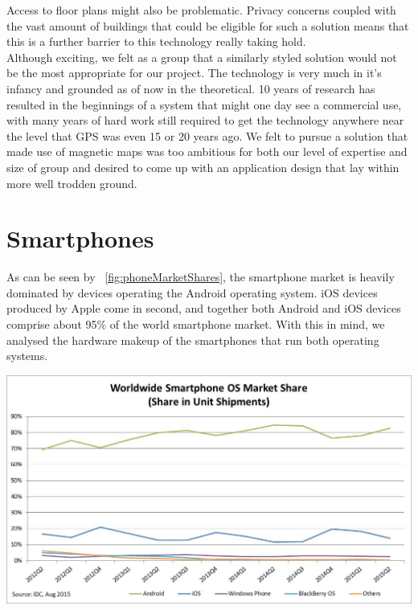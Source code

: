 \documentclass[main.tex]{subfiles}
\begin{document}
 Access to floor plans might also be problematic. Privacy concerns coupled with the vast amount of buildings that could be eligible for such a solution means that this is a further barrier to this technology really taking hold.\\
 
Although exciting, we felt as a group that a similarly styled solution would not be the most appropriate for our project. The technology is very much in it's infancy and grounded as of now in the theoretical. 10 years of research has resulted in the beginnings of a system that might one day see a commercial use, with many years of hard work still required to get the technology anywhere near the level that GPS was even 15 or 20 years ago. We felt to pursue a solution that made use of magnetic maps was too ambitious for both our level of expertise and size of group and desired to come up with an application design that lay within more well trodden ground.
 
\section{Smartphones}

As can be seen by ~\ref{fig:phoneMarketShares}, the smartphone market is heavily dominated by devices operating the Android operating system. iOS devices produced by Apple come in second, and together both Android and iOS devices comprise about 95\% of the world smartphone market. With this in mind, we analysed the hardware makeup of the smartphones that run both operating systems. \\

\begin{center}
\includegraphics[scale=0.9]{images/phoneMarketShare.png}
\label{fig:phoneMarketShares}
\end{center}
\end{document}

